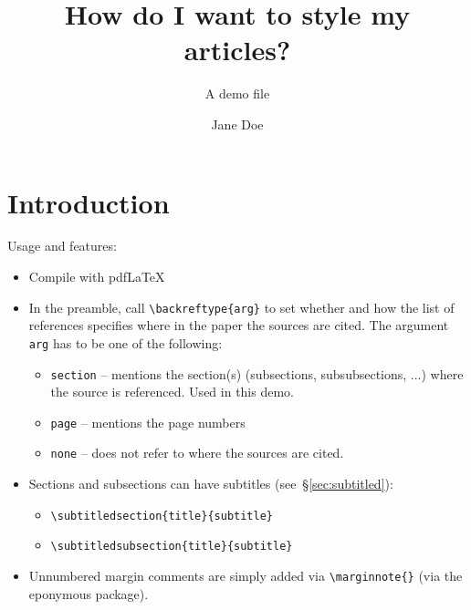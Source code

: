 \documentclass[a4paper]{article}
\title{How do I want to style my articles?}
\subtitle{A demo file}
\author{Jane Doe}
\begin{document}
\maketitle
\startmain

\section{Introduction}
Usage and features:
\begin{itemize}
    \item Compile with pdfLaTeX
    \item In the preamble, call \verb|\backreftype{arg}| to set whether and how the list of references specifies where in the paper the sources are cited. The argument \verb|arg| has to be one of the following:
    \begin{itemize}
        \item \verb|section| -- mentions the section(s) (subsections, subsubsections, ...) where the source is referenced. Used in this demo.
        \item \verb|page| -- mentions the page numbers
        \item \verb|none| -- does not refer to where the sources are cited.
    \end{itemize}
    \item Sections and subsections can have subtitles (see~\S\ref{sec:subtitled}):
    \begin{itemize}
        \item \verb|\subtitledsection{title}{subtitle}|
        \item \verb|\subtitledsubsection{title}{subtitle}| 
    \end{itemize}
    \item Unnumbered margin comments are simply added via \verb|\marginnote{}| (via the eponymous package).
\end{itemize}
\end{document}
